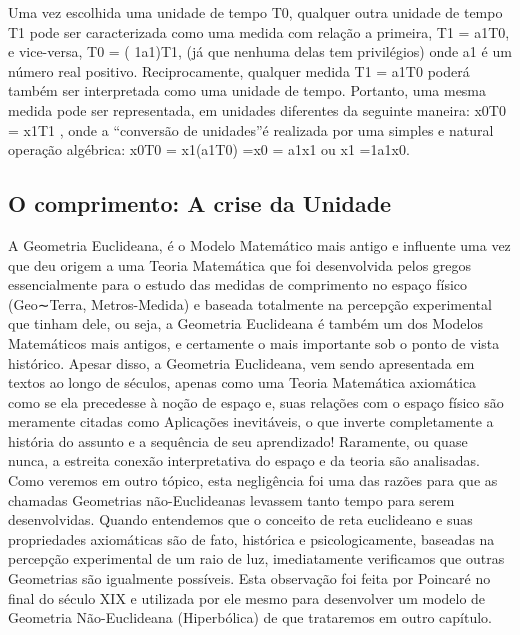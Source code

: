 Uma vez escolhida uma unidade de tempo T0, qualquer outra unidade de tempo T1 pode ser caracterizada como uma medida com relação a primeira, T1 = a1T0, e vice-versa, T0 = ( 1a1)T1, (já que nenhuma delas tem privilégios) onde a1 é um número real
positivo. Reciprocamente, qualquer medida T1 = a1T0 poderá também ser interpretada como uma unidade de tempo. Portanto, uma mesma medida pode ser representada, em unidades diferentes da seguinte maneira: x0T0 = x1T1 , onde a “conversão de unidades”é
realizada por uma simples e natural operação algébrica:
x0T0 = x1(a1T0) =\Rightarrow x0 = a1x1 ou x1 =1a1x0.

\subsection{O comprimento: A crise da Unidade}

A Geometria Euclideana, é o Modelo Matemático mais antigo e influente uma vez que deu origem a uma Teoria Matemática que foi desenvolvida pelos gregos essencialmente para o estudo das medidas de comprimento no espaço físico (Geo∼Terra, Metros-Medida) e baseada totalmente na percepção experimental que tinham dele, ou seja, a Geometria Euclideana é também um dos Modelos Matemáticos mais antigos, e certamente o mais importante sob o ponto de vista histórico. Apesar disso, a Geometria Euclideana, vem sendo apresentada em textos ao longo de séculos, apenas como uma Teoria Matemática axiomática como se ela precedesse à noção de espaço e, suas relações com o espaço físico são meramente citadas como Aplicações inevitáveis, o que inverte completamente a história do assunto e a sequência de seu aprendizado! Raramente, ou quase nunca, a estreita conexão interpretativa do espaço e da teoria são analisadas. Como veremos em outro tópico, esta negligência foi uma das razões para que as chamadas Geometrias não-Euclideanas levassem tanto tempo para serem desenvolvidas. Quando entendemos que o conceito de reta euclideano e suas propriedades axiomáticas são de fato, histórica e psicologicamente, baseadas na percepção experimental de um raio de luz, imediatamente verificamos que outras Geometrias são igualmente possíveis. Esta observação foi feita por Poincaré no final do século XIX e utilizada por ele mesmo para desenvolver um modelo de Geometria Não-Euclideana (Hiperbólica) de que trataremos em outro capítulo.

